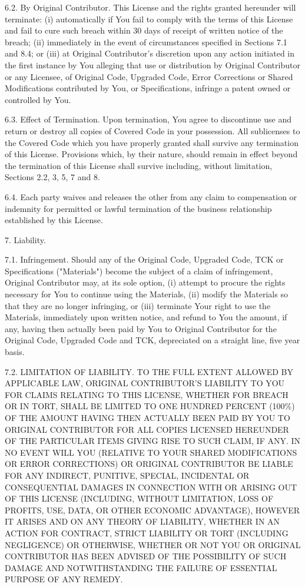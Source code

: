 {6.2.  By Original Contributor.  This License and the rights granted
hereunder will terminate: (i) automatically if You fail to comply with
the terms of this License and fail to cure such breach within 30 days
of receipt of written notice of the breach; (ii) immediately in the
event of circumstances specified in Sections 7.1 and 8.4; or (iii) at
Original Contributor's discretion upon any action initiated in the
first instance by You alleging that use or distribution by Original
Contributor or any Licensee, of Original Code, Upgraded Code, Error
Corrections or Shared Modifications contributed by You, or
Specifications, infringe a patent owned or controlled by You.

6.3.  Effect of Termination.  Upon termination, You agree to
discontinue use and return or destroy all copies of Covered Code in
your possession.  All sublicenses to the Covered Code which you have
properly granted shall survive any termination of this License.
Provisions which, by their nature, should remain in effect beyond the
termination of this License shall survive including, without
limitation, Sections 2.2, 3, 5, 7 and 8.

6.4.  Each party waives and releases the other from any claim to
compensation or indemnity for permitted or lawful termination of the
business relationship established by this License.

7.  Liability.

7.1.  Infringement.  Should any of the Original Code, Upgraded Code,
TCK or Specifications ("Materials") become the subject of a claim of
infringement, Original Contributor may, at its sole option, (i)
attempt to procure the rights necessary for You to continue using the
Materials, (ii) modify the Materials so that they are no longer
infringing, or (iii) terminate Your right to use the Materials,
immediately upon written notice, and refund to You the amount, if any,
having then actually been paid by You to Original Contributor for the
Original Code, Upgraded Code and TCK, depreciated on a straight line,
five year basis.

7.2.  LIMITATION OF LIABILITY.  TO THE FULL EXTENT ALLOWED BY
APPLICABLE LAW, ORIGINAL CONTRIBUTOR'S LIABILITY TO YOU FOR CLAIMS
RELATING TO THIS LICENSE, WHETHER FOR BREACH OR IN TORT, SHALL BE
LIMITED TO ONE HUNDRED PERCENT (100\%) OF THE AMOUNT HAVING THEN
ACTUALLY BEEN PAID BY YOU TO ORIGINAL CONTRIBUTOR FOR ALL COPIES
LICENSED HEREUNDER OF THE PARTICULAR ITEMS GIVING RISE TO SUCH CLAIM,
IF ANY.  IN NO EVENT WILL YOU (RELATIVE TO YOUR SHARED MODIFICATIONS
OR ERROR CORRECTIONS) OR ORIGINAL CONTRIBUTOR BE LIABLE FOR ANY
INDIRECT, PUNITIVE, SPECIAL, INCIDENTAL OR CONSEQUENTIAL DAMAGES IN
CONNECTION WITH OR ARISING OUT OF THIS LICENSE (INCLUDING, WITHOUT
LIMITATION, LOSS OF PROFITS, USE, DATA, OR OTHER ECONOMIC ADVANTAGE),
HOWEVER IT ARISES AND ON ANY THEORY OF LIABILITY, WHETHER IN AN ACTION
FOR CONTRACT, STRICT LIABILITY OR TORT (INCLUDING NEGLIGENCE) OR
OTHERWISE, WHETHER OR NOT YOU OR ORIGINAL CONTRIBUTOR HAS BEEN ADVISED
OF THE POSSIBILITY OF SUCH DAMAGE AND NOTWITHSTANDING THE FAILURE OF
ESSENTIAL PURPOSE OF ANY REMEDY.

}

